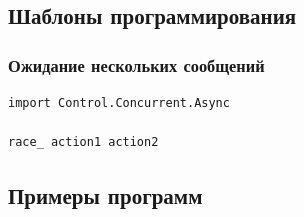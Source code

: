 \documentclass[9pt,a4paper]{article}
\begin{document}
\subsection{Шаблоны программирования}
\subsubsection{Ожидание нескольких сообщений}

\begin{lstlisting}
import Control.Concurrent.Async

race_ action1 action2
\end{lstlisting}

\subsection{Примеры программ}

\end{document}
